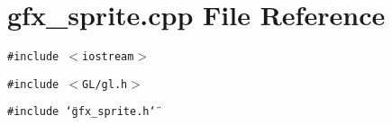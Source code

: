 \section{gfx\_\-sprite.cpp File Reference}
\label{gfx__sprite_8cpp}
{\tt \#include $<$iostream$>$}\par
{\tt \#include $<$GL/gl.h$>$}\par
{\tt \#include \char`\"{}gfx\_\-sprite.h\char`\"{}}\par
